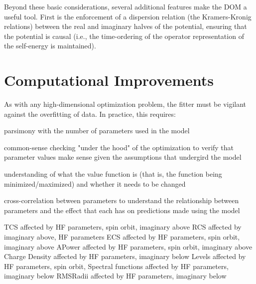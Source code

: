 Beyond these basic considerations, several additional features make the 
DOM a useful tool. First is the enforcement of a
dispersion relation (the Kramers-Kronig relations) between the real and imaginary
halves of the potential, ensuring that the potential is causal (i.e., the
time-ordering of the operator representation of the self-energy is maintained).

\section{Computational Improvements}
As with any high-dimensional optimization problem, the fitter must be vigilant
against the overfitting of data. In practice, this requires:

parsimony with the number of parameters used in the model

common-sense checking "under the hood" of the optimization to verify that
parameter values make sense given the assumptions that undergird the model

understanding of what the value function is (that is, the function being
minimized/maximized) and whether it needs to be changed

cross-correlation between parameters to understand the relationship between
parameters and the effect that each has on predictions made using the model

TCS affected by HF parameters, spin orbit, imaginary above
RCS affected by imaginary above, HF parameters
ECS affected by HF parameters, spin orbit, imaginary above
APower affected by HF parameters, spin orbit,  imaginary above
Charge Density affected by HF parameters, imaginary below
Levels affected by HF parameters, spin orbit,
Spectral functions affected by HF parameters, imaginary below
RMSRadii affected by HF parameters, imaginary below

